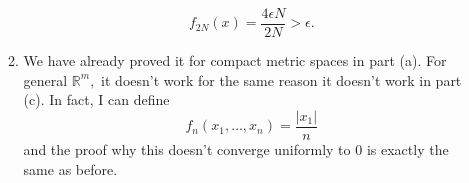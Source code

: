 \documentclass{article}
\numberwithin{equation}{section}
\begin{document}
\begin{enumerate}
\begin{enumerate}[label=(\alph*)]
        \begin{equation}
            f_{2N}(x) = \frac{4\epsilon N}{2N} > \epsilon.
        \end{equation}
        \item We have already proved it for compact metric spaces in part (a). For general $\mathbb{R}^m,$ it doesn't work for the same reason it doesn't work in part (c). In fact, I can define 
        \begin{equation}
            f_n(x_1,\dots,x_n) = \frac{|x_1|}{n}
        \end{equation}
        and the proof why this doesn't converge uniformly to $0$ is exactly the same as before.
    \end{enumerate}
\end{enumerate}
\end{document}

